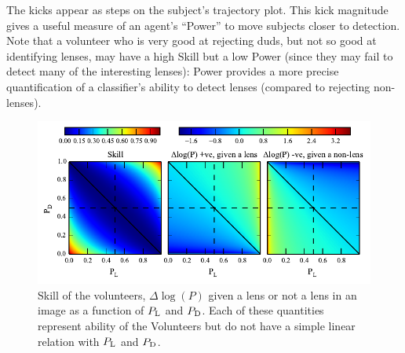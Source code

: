 \documentclass[useAMS,usenatbib,a4paper]{mn2e}
\begin{document}
The kicks appear as steps on the subject's trajectory plot. This kick
magnitude gives a useful measure of an agent's ``Power'' to move
subjects closer to detection.  Note that a volunteer who is very good at
rejecting duds, but not so good at identifying lenses, may have a high
Skill but a low Power (since they may fail to detect many of the
interesting lenses): Power provides a more precise quantification of a
classifier's ability to detect lenses (compared to rejecting non-lenses).


\begin{figure}
\begin{center}
\includegraphics[scale=1.0]{sw-cfhtls-figs/dlnp_skill.pdf}
\caption{ \label{fig:skilldlnp}
Skill of the volunteers, $\Delta\log(P)$ given a lens or not a lens in
an image as a function of $P_{\rm L}$ and $P_{\rm D}$. Each of these
quantities represent ability of the Volunteers but do not have a simple
linear relation with $P_{\rm L}$ and $P_{\rm D}$.  
}
\end{center}
\end{figure}







% 


%




\label{lastpage}
\bsp
\end{document}
